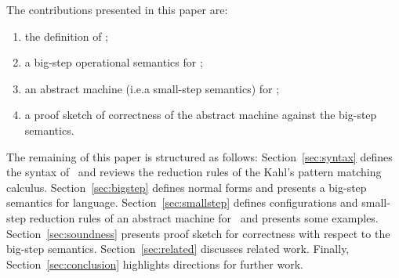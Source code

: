 The contributions presented in this paper are:
\begin{enumerate}
\item the definition of \lambdaPMC;
\item a big-step operational semantics for \lambdaPMC;
\item an abstract machine (i.e.\@ a small-step semantics) for \lambdaPMC;
\item a proof sketch of correctness of the abstract machine against
  the big-step semantics.
\end{enumerate}

The remaining of this paper is structured as follows:
Section~\ref{sec:syntax} defines the syntax of \lambdaPMC\ and reviews
the reduction rules of the Kahl's pattern matching
calculus. Section~\ref{sec:bigstep} defines normal forms and presents
a big-step semantics for language.  Section~\ref{sec:smallstep}
defines configurations and small-step reduction rules of an abstract
machine for \lambdaPMC\ and presents some examples.
Section~\ref{sec:soundness} presents proof sketch for correctness with
respect to the big-step semantics.
Section~\ref{sec:related} discusses related
work. Finally, Section~\ref{sec:conclusion} highlights
directions for further work.





